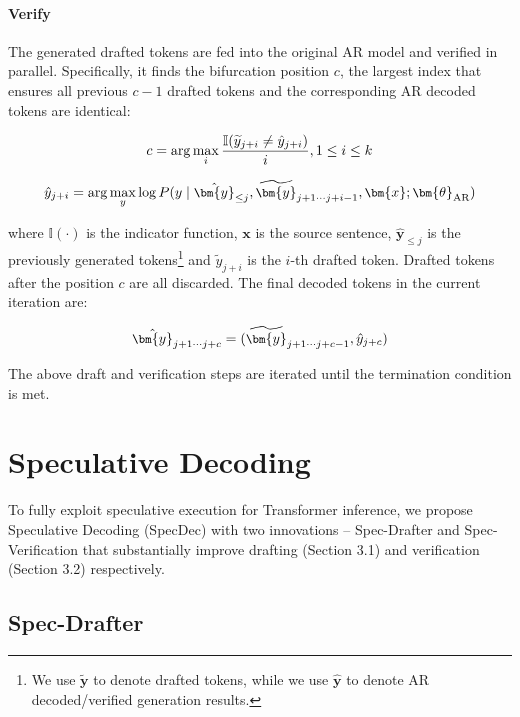 \paragraph{Verify} The generated drafted tokens are fed into the original AR model and verified in parallel. Specifically, it finds the bifurcation position $c$, the largest index that ensures all previous $c-1$ drafted tokens and the corresponding AR decoded tokens are identical:

\begin{equation}\small
c = \arg \max_i \frac{\mathbb{I}(\widetilde{y}_{j+i} \neq \hat{y}_{j+i})}{i}, 1 \le i \le k 
\end{equation}

\begin{equation}\label{eq:strict-verify}\small
\hat{y}_{j+i} = \arg \max_{y} \log P(y\mid \hat{\bm{y}}_{\le j},\widetilde{\bm{y}}_{j+1 \cdots j+i-1}, \bm{x}; \bm{\theta}_{\textrm{AR}})
\end{equation}

where $\mathbb{I}(\cdot)$ is the indicator function, $\bm{x}$ is the source sentence, $\hat{\bm{y}}_{\le j}$ is the previously generated tokens\footnote{We use $\widetilde{\bm{y}}$ to denote drafted tokens, while we use $\hat{\bm{y}}$ to denote AR decoded/verified generation results.} and $\widetilde{y}_{j+i}$ is the $i$-th drafted token. Drafted tokens after the position $c$ are all discarded. The final decoded tokens in the current iteration are:

\begin{equation}
\small
    \hat{\bm{y}}_{j+1 \cdots j+c} = (\widetilde{\bm{y}}_{j+1  \cdots  j + c - 1}, \hat{y}_{j+c})
\end{equation}

The above draft and verification steps are iterated until the termination condition is met. 

\section{Speculative Decoding}
\label{sec:SpecDec}
To fully exploit speculative execution for Transformer inference, we propose Speculative Decoding (SpecDec) with two innovations -- Spec-Drafter and Spec-Verification that substantially improve drafting (Section 3.1) and verification (Section 3.2) respectively.

\subsection{Spec-Drafter}
